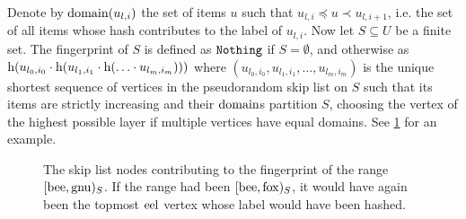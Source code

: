 Denote by $\operatorname{domain}(u_{l, i})$ the set of items $u$ such that $u_{l, i} \preceq u \prec u_{l, i + 1}$, i.e. the set of all items whose hash contributes to the label of $u_{l, i}$. Now let $S \subseteq U$ be a finite set. The fingerprint of $S$ is defined as $\mathtt{Nothing}$ if $S = \emptyset$, and otherwise as $\operatorname{h}(u_{l_0, i_0} \cdot \operatorname{h}(u_{l_1, i_1} \cdot \operatorname{h}(\ldots \cdot u_{l_m, i_m})))$ where $(u_{l_0, i_0}, u_{l_1, i_1}, \ldots, u_{l_m, i_m})$ is the unique shortest sequence of vertices in the pseudorandom skip list on $S$ such that its items are strictly increasing and their $\operatorname{domain}$s partition $S$, choosing the vertex of the highest possible layer if multiple vertices have equal domains. See \cref{fig:skip-list-fingerprint} for an example.

\begin{figure*}
\begin{scaletikzpicturetowidth}{\textwidth}
\end{scaletikzpicturetowidth}

\caption{
The skip list nodes contributing to the fingerprint of the range $[{\mathrm{bee}},{\mathrm{gnu}})_{S}$. If the range had been $[{\mathrm{bee}},{\mathrm{fox}})_{S}$, it would have again been the topmost $\mathrm{eel}$ vertex whose label would have been hashed.
}

\label{fig:skip-list-fingerprint}
\end{figure*}

